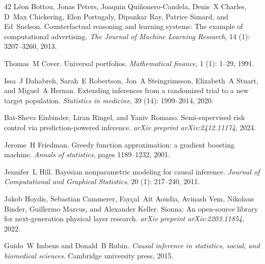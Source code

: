 \documentclass{article}
\theoremstyle{plain}
\theoremstyle{definition}
\theoremstyle{remark}
\begin{document}
\begin{thebibliography}{42}
L{\'e}on Bottou, Jonas Peters, Joaquin Qui{\~n}onero-Candela, Denis~X Charles, D~Max Chickering, Elon Portugaly, Dipankar Ray, Patrice Simard, and Ed~Snelson.
\newblock Counterfactual reasoning and learning systems: The example of computational advertising.
\newblock \emph{The Journal of Machine Learning Research}, 14 (1): 3207--3260, 2013.

Thomas~M Cover.
\newblock Universal portfolios.
\newblock \emph{Mathematical finance}, 1 (1): 1--29, 1991.

Issa~J Dahabreh, Sarah~E Robertson, Jon~A Steingrimsson, Elizabeth~A Stuart, and Miguel~A Hernan.
\newblock Extending inferences from a randomized trial to a new target population.
\newblock \emph{Statistics in medicine}, 39 (14): 1999--2014, 2020.

Bat-Sheva Einbinder, Liran Ringel, and Yaniv Romano.
\newblock Semi-supervised risk control via prediction-powered inference.
\newblock \emph{arXiv preprint arXiv:2412.11174}, 2024.

Jerome~H Friedman.
\newblock Greedy function approximation: a gradient boosting machine.
\newblock \emph{Annals of statistics}, pages 1189--1232, 2001.

Jennifer~L Hill.
\newblock Bayesian nonparametric modeling for causal inference.
\newblock \emph{Journal of Computational and Graphical Statistics}, 20 (1): 217--240, 2011.

Jakob Hoydis, Sebastian Cammerer, Fay{\c{c}}al~Ait Aoudia, Avinash Vem, Nikolaus Binder, Guillermo Marcus, and Alexander Keller.
\newblock Sionna: An open-source library for next-generation physical layer research.
\newblock \emph{arXiv preprint arXiv:2203.11854}, 2022.

Guido~W Imbens and Donald~B Rubin.
\newblock \emph{Causal inference in statistics, social, and biomedical sciences}.
\newblock Cambridge university press, 2015.


\end{thebibliography}
\end{document}

